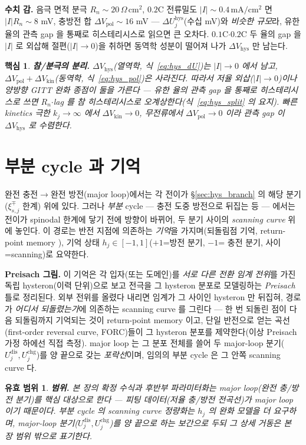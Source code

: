 \documentclass[11pt,a4paper]{article}
\newtheorem*{keybox}{핵심}
\newtheorem*{boundbox}{유효 범위}
\newcommand{\dis}{\mathrm{dis}}
\newcommand{\chg}{\mathrm{chg}}
\newcommand{\hys}{\mathrm{hys}}
\newcommand{\pol}{\mathrm{pol}}
\newcommand{\kin}{\mathrm{kin}}
\begin{document}
\textbf{수치 감.} 음극 면적 분극 $R_n\!\sim\!20\,\Omega\,\mathrm{cm^2}$, $0.2$C 전류밀도 $|I|\!\sim\!0.4\,
\mathrm{mA/cm^2}$ 면 $|I|R_n\!\sim\!8$ mV, 충방전 합 $\Delta V_\pol\!\sim\!16$ mV — $\Delta U_j^\hys$(수십 mV)와
\emph{비슷한 규모}라, 유한 율의 관측 gap 을 통째로 히스테리시스로 읽으면 큰 오차다. $0.1$C$\cdot$$0.2$C 두 율의
gap 을 $|I|$ 로 외삽해 절편($|I|\!\to\!0$)을 취하면 동역학 성분이 떨어져 나가 $\Delta V_\hys$ 만 남는다.
\begin{keybox}
\textbf{참/분극의 분리.} $\Delta V_\hys$(열역학, 식~\eqref{eq:hys_dU})는 $|I|\to0$ 에서 \emph{남고}, $\Delta
V_\pol+\Delta V_\kin$(동역학, 식~\eqref{eq:hys_pol})은 \emph{사라진다}. 따라서 저율 외삽($|I|\to0$)이나 양방향
GITT 완화 종점이 둘을 가른다 — 유한 율의 관측 gap 을 통째로 히스테리시스로 쓰면 $R_n$$\cdot$lag 를 참
히스테리시스로 오계상한다(식~\eqref{eq:hys_split} 의 요지). 빠른 kinetics 극한 $k_j\to\infty$ 에서 $\Delta
V_\kin\to0$, 무전류에서 $\Delta V_\pol\to0$ 이라 관측 gap 이 $\Delta V_\hys$ 로 수렴한다.
\end{keybox}

\section{부분 cycle 과 기억}\label{sec:hys_memory}
완전 충전$\to$완전 방전(major loop)에서는 각 전이가 \S\ref{sec:hys_branch} 의 해당 분기($\xi_{s,j}^\mp$ 한계)
위에 있다. 그러나 \emph{부분} cycle — 충전 도중 방전으로 뒤집는 등 — 에서는 전이가 spinodal 한계에 닿기 전에
방향이 바뀌어, 두 분기 사이의 \emph{scanning curve} 위에 놓인다. 이 경로는 반전 지점에 의존하는 \emph{기억}을
가지며(되돌림점 기억, return-point memory \cite{sethna1993}), 기억 상태 $h_j\in[-1,1]$($+1$=방전 분기, $-1$=
충전 분기, 사이=scanning)로 요약한다.

\textbf{Preisach 그림.} 이 기억은 각 입자(또는 도메인)를 \emph{서로 다른 전환 임계 전위}를 가진 독립
hysteron(이력 단위)으로 보고 전극을 그 hysteron 분포로 모델링하는 \emph{Preisach} 틀로 정리된다. 외부 전위를
올렸다 내리면 임계가 그 사이인 hysteron 만 뒤집혀, 경로가 \emph{어디서 되돌렸는가}에 의존하는 scanning curve 를
그린다 — 한 번 되돌린 점이 다음 되돌림까지 기억되는 것이 return-point memory 이고, 단일 반전으로 얻는
곡선(first-order reversal curve, FORC)들이 그 hysteron 분포를 제약한다(이상 Preisach 가정 하에선 직접 측정).
major loop 는 그 분포 전체를 쓸어 두 major-loop 분기($U_j^\dis,U_j^\chg$)를 양 끝으로 갖는 \emph{포락선}이며,
임의의 부분 cycle 은 그 안쪽 scanning curve 다.
\begin{boundbox}
\textbf{범위.} 본 장의 확정 수식과 후반부 파라미터화는 \emph{major loop}(완전 충/방전 분기)를 핵심 대상으로
한다 — 피팅 데이터(저율 충/방전 전곡선)가 major loop 이기 때문이다. 부분 cycle 의 scanning curve 정량화는
$h_j$ 의 완화 모델을 더 요구하며, major-loop 분기($U_j^\dis,U_j^\chg$)를 양 끝으로 하는 보간으로 두되 그 상세
거동은 본 장 범위 밖으로 표기한다.
\end{boundbox}
\end{document}
